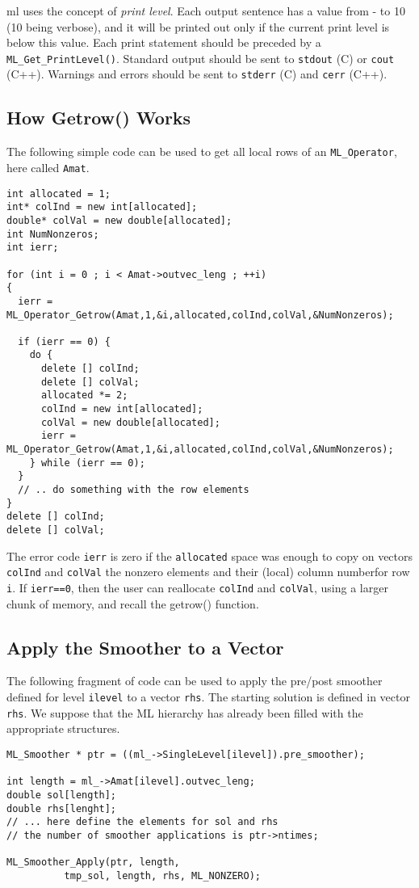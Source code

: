 \documentclass[10pt,letter,relax]{SANDreport}
\newcommand{\ML}     {{\sc ml }}
\begin{document}
\ML uses the concept of {\sl print level}. Each output sentence has a
  value from - to 10 (10 being verbose), and it will be printed out only if
  the current print level is below this value. Each print statement should be
  preceded by a \verb!ML_Get_PrintLevel()!.
Standard output should be sent to \verb!stdout! (C) or \verb!cout! (C++).
Warnings and errors should be sent to \verb!stderr! (C) and \verb!cerr!
(C++).

\subsection{How Getrow() Works}

The following simple code can be used to get all local rows of an
\verb!ML_Operator!, here called \verb!Amat!.
\begin{verbatim}
int allocated = 1;
int* colInd = new int[allocated];
double* colVal = new double[allocated];
int NumNonzeros;
int ierr;

for (int i = 0 ; i < Amat->outvec_leng ; ++i)
{
  ierr = ML_Operator_Getrow(Amat,1,&i,allocated,colInd,colVal,&NumNonzeros);

  if (ierr == 0) {
    do {
      delete [] colInd;
      delete [] colVal;
      allocated *= 2;
      colInd = new int[allocated];
      colVal = new double[allocated];
      ierr = ML_Operator_Getrow(Amat,1,&i,allocated,colInd,colVal,&NumNonzeros);
    } while (ierr == 0);
  }
  // .. do something with the row elements
}
delete [] colInd;
delete [] colVal;
\end{verbatim}
The error code \verb!ierr! is zero if the \verb!allocated! space was enough to
copy on vectors \verb!colInd! and \verb!colVal! the nonzero elements and their
(local) column numberfor row \verb!i!. If \verb!ierr==0!, then the user can
reallocate \verb!colInd! and \verb!colVal!, using a larger chunk of memory,
  and recall the getrow() function.

\subsection{Apply the Smoother to a Vector}

The following fragment of code can be used to apply the pre/post smoother
defined for level \verb!ilevel! to a vector \verb!rhs!. The starting solution
is defined in vector \verb!rhs!. We suppose that the ML hierarchy has already
been filled with the appropriate structures.
\begin{verbatim}
ML_Smoother * ptr = ((ml_->SingleLevel[ilevel]).pre_smoother);

int length = ml_->Amat[ilevel].outvec_leng;
double sol[length];
double rhs[lenght];
// ... here define the elements for sol and rhs
// the number of smoother applications is ptr->ntimes;

ML_Smoother_Apply(ptr, length,
		  tmp_sol, length, rhs, ML_NONZERO);
\end{verbatim}
\end{document}
